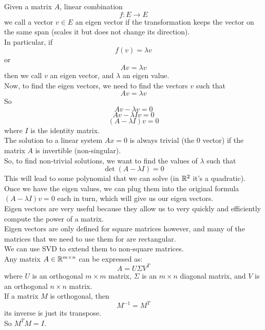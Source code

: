 \documentclass[12pt]{article}
\begin{document}
    Given a matrix $A$, linear combination
    \[f: E \to E \]
    we call a vector $v \in E$ an eigen vector
    if the transformation keeps the vector
    on the same span
    (scales it but does not change its direction). \\
    In particular, if
    \[ f(v) = \lambda v \]
    or 
    \[ Av = \lambda v \]
    then we call $v$ an eigen vector,
    and $\lambda$ an eigen value. \\
    
    Now, to find the eigen vectors,
    we need to find the vectors $v$ such that 
    \[ Av = \lambda v \]
    So
    \[ Av - \lambda v = 0 \]
    \[ Av - \lambda I v = 0 \]
    \[ (A - \lambda I)v = 0 \]
    where $I$ is the identity matrix. \\

    The solution to a linear system $Ax = 0$
    is always trivial (the 0 vector)
    if the matrix $A$ is invertible (non-singular). \\
    So, to find non-trivial solutions,
    we want to find the values of $\lambda$
    such that 
    \[ \det(A - \lambda I) = 0\]
    This will lead to some polynomial that we
    can solve (in $\mathbb{R}^2$ it's a quadratic). \\
    
    Once we have the eigen values,
    we can plug them into 
    the original formula $(A - \lambda I)v = 0$
    each in turn, 
    which will give us our eigen vectors. \\
    
    Eigen vectors are very useful because
    they allow us to very quickly and efficiently
    compute the power of a matrix. \\
    Eigen vectors are only defined for square
    matrices however,
    and many of the matrices that we need to use them
    for are rectangular. \\
    We can use SVD to extend them to non-square matrices. \\

    Any matrix $A \in \mathbb{R}^{m \times n}$
    can be expressed as:
    \[ A = U\Sigma V^T \]
    where $U$ is an orthogonal $m \times m$ matrix,
    $\Sigma$ is an $m \times n$ diagonal matrix,
    and $V$ is an orthogonal $n \times n$ matrix. \\

    If a matrix $M$ is orthogonal, then
    \[ M^{-1} = M^T \]
    its inverse is just its transpose. \\
    So $M^TM = I$. \\
\end{document}
